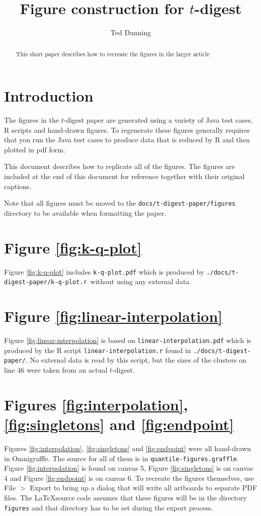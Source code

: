 \documentclass[]{statsoc}
\title[Figure construction]{Figure construction for $t$-digest}
\author{Ted Dunning}
\date{}                                           %
\begin{document}
\begin{abstract}
This short paper describes how to recreate the figures in the larger article
\end{abstract}
\maketitle
\section*{Introduction}
The figures in the $t$-digest paper are generated using a variety of Java test cases, R scripts and hand-drawn figures. To regenerate these figures generally requires that you run the Java test cases to produce data that is reduced by R and then plotted in pdf form.

This document describes how to replicate all of the figures. The figures are included at the end of this document for reference together with their original captions.

Note that all figures must be moved to the {\tt docs/t-digest-paper/figures} directory to be available when formatting the paper.
\section*{Figure \ref{fig:k-q-plot}}
Figure \ref{fig:k-q-plot} includes {\tt k-q-plot.pdf} which is produced by {\tt ./docs/t-digest-paper/k-q-plot.r }without using any external data.
\section*{Figure \ref{fig:linear-interpolation}}
Figure \ref{fig:linear-interpolation} is based on {\tt linear-interpolation.pdf} which is produced by the R script {\tt linear-interpolation.r} found in {\tt ./docs/t-digest-paper/}. No external data is read by this script, but the sizes of the clusters on line 46 were taken from an actual $t$-digest.

\section*{Figures \ref{fig:interpolation}, \ref{fig:singletons} and \ref{fig:endpoint}}
Figures \ref{fig:interpolation}, \ref{fig:singletons} and \ref{fig:endpoint} were all hand-drawn in Omnigraffle. The source for all of them is in {\tt quantile-figures.graffle}. Figure \ref{fig:interpolation} is found on canvas 5, Figure \ref{fig:singletons} is on canvas 4 and Figure \ref{fig:endpoint} is on canvas 6. To recreate the figures themselves, use File $>$ Export to bring up a dialog that will write all artboards to separate PDF files. The  \LaTeX source code assumes that these figures will be in the directory {\tt figures} and that directory has to be set during the export process.
\end{document}
